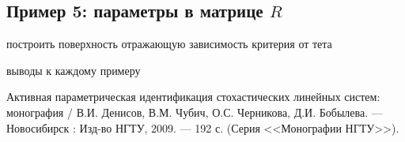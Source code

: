 \documentclass[a4paper,14pt]{extarticle}
\renewcommand{\baselinestretch}{1.5}
\begin{document}
\subsection{Пример 5: параметры в матрице $R$}

построить поверхность отражающую зависимость критерия от тета

выводы к каждому примеру

\begin{thebibliography}{9}

\begin{sloppypar}

 Активная параметрическая идентификация стохастических линейных
  систем: монография / В.И. Денисов, В.М. Чубич, О.С. Черникова, Д.И. Бобылева.
    --- Новосибирск : Изд-во НГТУ, 2009. --- 192 с.
    (Серия <<Монографии НГТУ>>).

\end{sloppypar}

\end{thebibliography}

\renewcommand{\baselinestretch}{1}
\end{document}
